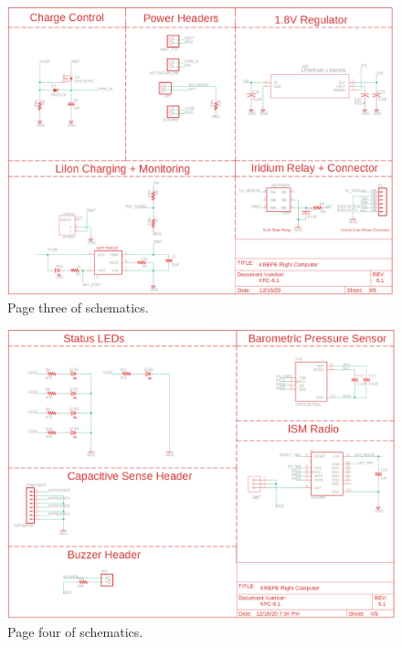 \documentclass{article}
\begin{document}
\begin{figure}[H]
    \centering
    \includegraphics[width=\textwidth]{images/page3.png}
    \caption{Page three of schematics.}
    \label{fig:page1-3}
\end{figure}

\begin{figure}[H]
    \centering
    \includegraphics[width=\textwidth]{images/page4.png}
    \caption{Page four of schematics.}
    \label{fig:page1-4}
\end{figure}


\end{document}
